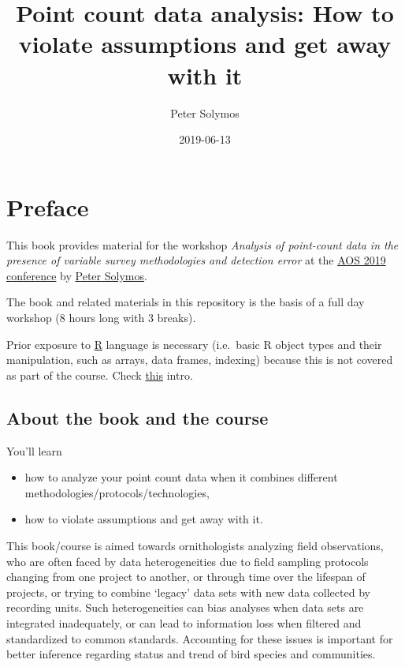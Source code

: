 \documentclass[12pt,]{book}
\title{Point count data analysis: How to violate assumptions and get away with it}
\author{Peter Solymos}
\date{2019-06-13}
\providecommand{\tightlist}{%
  \setlength{\itemsep}{0pt}\setlength{\parskip}{0pt}}
\begin{document}
\maketitle

{
\hypersetup{linkcolor=black}
\setcounter{tocdepth}{2}
\tableofcontents
}
\listoftables
\listoffigures
\hypertarget{foreword}{%
\chapter*{Preface}\label{foreword}}

This book provides material for the workshop
\emph{Analysis of point-count data in the presence of variable survey methodologies and detection error}
at the \href{https://amornithmeeting.org/}{AOS 2019 conference}
by \href{http://peter.solymos.org}{Peter Solymos}.

The book and related materials in this repository is the basis of a
full day workshop (8 hours long with 3 breaks).

Prior exposure to \href{https://www.r-project.org/}{R} language is necessary
(i.e.~basic R object types and their manipulation, such as arrays, data frames, indexing)
because this is not covered as part of the course.
Check \href{_etc/R-basics.pdf}{this} intro.

\hypertarget{about-the-book-and-the-course}{%
\section*{About the book and the course}\label{about-the-book-and-the-course}}

You'll learn

\begin{itemize}
\tightlist
\item
  how to analyze your point count data when it combines different methodologies/protocols/technologies,
\item
  how to violate assumptions and get away with it.
\end{itemize}

This book/course is aimed towards ornithologists analyzing field observations,
who are often faced by data heterogeneities due to
field sampling protocols changing from one project to another,
or through time over the lifespan of projects, or trying to combine
`legacy' data sets with new data collected by recording units.
Such heterogeneities can bias analyses when data sets are integrated
inadequately, or can lead to information loss when filtered and standardized to
common standards. Accounting for these issues is important for better
inference regarding status and trend of bird species and communities.
\end{document}
